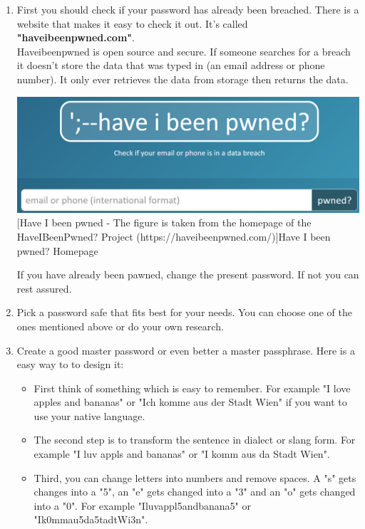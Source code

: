 \documentclass[conference]{IEEEtran}
\begin{document}
\begin{enumerate}
    \item First you should check if your password has already been breached. There is a website that makes it easy to check it out. It's called \textbf{"haveibeenpwned.com"}.\\
          Haveibeenpwned is open source and secure. If someone searches for a breach it doesn't store the data that was typed in (an email address or phone number). It only ever retrieves the data from storage then returns the data. \vspace{0.5cm}
          \begin{center}
              \includegraphics[scale=0.29]{./images/haveibeenpwned.png}
              [Have I been pwned - The figure is taken from the homepage of the HaveIBeenPwned? Project (https://haveibeenpwned.com/)]{Have I been pwned? Homepage}
          \end{center}
          If you have already been pawned, change the present password. If not you can rest assured.
    \item Pick a password safe that fits best for your needs. You can choose one of the ones mentioned above or do your own research.
    \item Create a good master password or even better a master passphrase. Here is a easy way to to design it:
          \begin{itemize}
              \item First think of something which is easy to remember. For example "I love apples and bananas" or "Ich komme aus der Stadt Wien" if you want to use your native language.
              \item The second step is to transform the sentence in dialect or slang form. For example "I luv appls and bananas" or "I komm aus da Stadt Wien".
              \item Third, you can change letters into numbers and remove spaces. A "s" gets changes into a "5", an "e" gets changed into a "3" and an "o" gets changed into a "0". For example "Iluvappl5andbanana5" or "Ik0mmau5da5tadtWi3n".

\end{itemize}
\end{enumerate}
\end{document}
